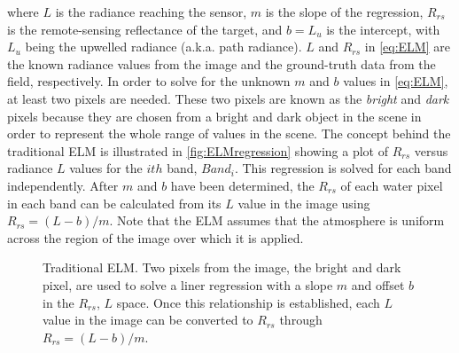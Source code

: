 \documentclass[onecolumn,3p,letterpaper]{elsarticle}
\begin{document}
\noindent where $L$ is the radiance reaching the sensor, $m$ is the slope of the regression, $R_{rs}$ is the remote-sensing reflectance of the target, and $b=L_u$ is the intercept, with $L_u$ being the upwelled radiance (a.k.a. path radiance). $L$ and $R_{rs}$ in \autoref{eq:ELM} are the known radiance values from the image and the ground-truth data from the field, respectively. In order to solve for the unknown $m$ and $b$ values in \autoref{eq:ELM}, at least two pixels are needed. These two pixels are known as the {\it bright} and {\it dark} pixels because they are chosen from a bright and dark object in the scene in order to represent the whole range of values in the scene. The concept behind the traditional ELM is illustrated in \autoref{fig:ELMregression} showing a plot of $R_{rs}$ versus radiance $L$ values for the $ith$ band, $Band_{i}$. This regression is solved for each band independently. After $m$ and $b$ have been determined, the $R_{rs}$ of each water pixel in each band can be calculated from its $L$ value in the image using $R_{rs}=(L-b)/m$. Note that the ELM assumes that the atmosphere is uniform across the region of the image over which it is applied.

\begin{figure}[htb]
	\centering
\caption{Traditional ELM. Two pixels from the image, the bright and dark pixel, are used to solve a liner regression with a slope $m$ and offset $b$ in the $R_{rs}$, $L$ space. Once this relationship is established, each $L$ value in the image can be converted to $R_{rs}$ through $R_{rs}=(L-b)/m$. \label{fig:ELMregression}}
\end{figure}
\end{document}
